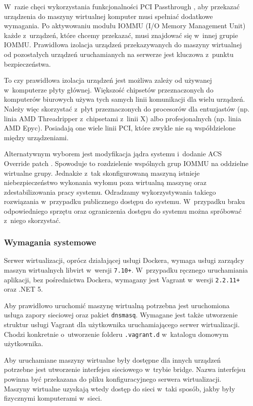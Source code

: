 \documentclass[../opis-rozwiazania.tex]{subfiles}
\begin{document}
W~razie chęci wykorzystania funkcjonalności PCI Passthrough \parencite{pci-passthrough}, aby przekazać urządzenia do maszyny wirtualnej komputer musi spełniać dodatkowe wymagania.
Po aktywowaniu modułu IOMMU (I/O Memory Management Unit) \parencite{amd-iommu} każde z~urządzeń, które chcemy przekazać, musi znajdować się w~innej grupie IOMMU.
Prawidłowa izolacja urządzeń przekazywanych do maszyny wirtualnej od pozostałych urządzeń uruchamianych na serwerze jest kluczowa z~punktu bezpieczeństwa.

To czy prawidłowa izolacja urządzeń jest możliwa zależy od używanej w~komputerze płyty głównej.
Większość chipsetów przeznaczonych do komputerów biurowych używa tych samych linii komunikacji dla wielu urządzeń.
Należy więc skorzystać z~płyt przeznaczonych do procesorów dla entuzjastów (np. linia AMD Threadripper z~chipsetami z~linii X) albo profesjonalnych (np. linia AMD Epyc).
Posiadają one wiele linii PCI, które zwykle nie są współdzielone między urządzeniami.

Alternatywnym wyborem jest modyfikacja jądra systemu i~dodanie ACS Override patch \parencite{acs-override}.
Spowoduje to rozdzielenie wspólnych grup IOMMU na oddzielne wirtualne grupy.
Jednakże z~tak skonfigurowaną maszyną istnieje niebezpieczeństwo wykonania wyłomu poza wirtualną maszynę oraz zdestabilizowania pracy systemu.
Odradzamy wykorzystywania takiego rozwiązania w~przypadku publicznego dostępu do systemu.
W~przypadku braku odpowiedniego sprzętu oraz ograniczenia dostępu do systemu można spróbować z~niego skorzystać.

\subsubsection{Wymagania systemowe}
Serwer wirtualizacji, oprócz działającej usługi Dockera, wymaga usługi zarządcy maszyn wirtualnych libvirt w~wersji \texttt{7.10+}. W~przypadku ręcznego uruchamiania aplikacji, bez pośrednictwa Dockera, wymagany jest Vagrant w~wersji \texttt{2.2.11+} oraz .NET 5.

Aby prawidłowo uruchomić maszynę wirtualną potrzebna jest uruchomiona usługa zapory sieciowej oraz pakiet \texttt{dnsmasq}.
Wymagane jest także utworzenie struktur usługi Vagrant dla użytkownika uruchamiającego serwer wirtualizacji.
Chodzi konkretnie o~utworzenie folderu \texttt{.vagrant.d} w~katalogu domowym użytkownika.

Aby uruchamiane maszyny wirtualne były dostępne dla innych urządzeń potrzebne jest utworzenie interfejsu sieciowego w~trybie bridge.
Nazwa interfejsu powinna być przekazana do pliku konfiguracyjnego serwera wirtualizacji.
Maszyny wirtualne uzyskają wtedy dostęp do sieci w~taki sposób, jakby były fizycznymi komputerami w~sieci.
\end{document}
